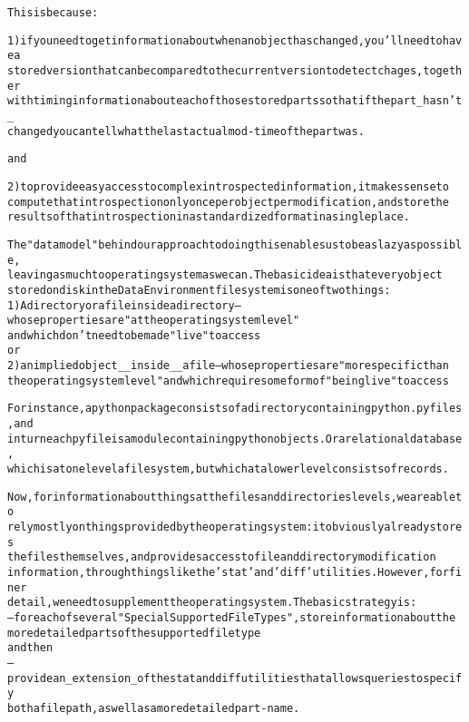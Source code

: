 \begin{alltt}
This is because:

1) if you need to get information about when an object has changed, you'll need to have a 
stored version that can be compared to the current version to detect chages, together 
with timing information about each of those stored parts so that if the part \_hasn't\_ 
changed you can tell what the last actual mod-time of the part was. 

and     

2) to provide easy access to complex introspected information, it makes sense to 
compute that introspection only once per object per modification, and store the
results of that introspection in a standardized format in a single place. 
                
The  "data model" behind our approach to doing this enables us to be as lazy as possible, 
leaving as much to operating system as we can.  The basic idea is that every object 
stored on disk in the Data Environment file system is one of two things:
        1) A directory or a file inside a directory  -- whose properties are "at the operating system level" 
                and which don't need to be made "live" to access
or
        2) an implied object \_\_inside\_\_ a file -- whose properties are "more specific than
        the operating system level" and which require some form of "being live" to access
                
For instance, a python package consists of a directory containing python .py files, and
in turn each py file is a module containing python objects.  Or a relational database, 
which is at one level a filesystem, but which at a lower level consists of records. 

Now, for information about things at the files and directories levels, we are able to 
rely mostly on things provided by the operating system: it obviously already stores 
the files themselves, and provides access to file and directory modification 
information, through things like the 'stat' and 'diff' utilities.     However, for finer 
detail, we need to supplement the operating system.   The basic strategy is:
        -- for each of several "Special Supported File Types", store information about the 
        more detailed parts of the supported file type
and then
        -- provide an \_extension\_ of the stat and diff utilities that allows queries to specify 
        both a file path, as well as a more detailed  part-name.


\end{alltt}
